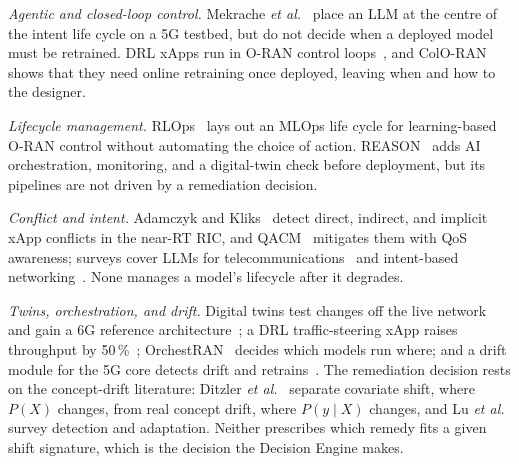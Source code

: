 \documentclass[conference]{IEEEtran}
\begin{document}
\emph{Agentic and closed-loop control.} Mekrache \textit{et al.}~\cite{mekrache2024intent}
place an LLM at the centre of the intent life cycle on a 5G testbed, but do not decide when a
deployed model must be retrained. DRL xApps run in O-RAN control loops~\cite{bonati2021intelligence},
and ColO-RAN~\cite{polese2023coloran} shows that they need online retraining once deployed,
leaving when and how to the designer.

\emph{Lifecycle management.} RLOps~\cite{li2022rlops} lays out an MLOps life cycle for
learning-based O-RAN control without automating the choice of action.
REASON~\cite{parraullauri2025reason} adds AI orchestration, monitoring, and a digital-twin check
before deployment, but its pipelines are not driven by a remediation decision.

\emph{Conflict and intent.} Adamczyk and Kliks~\cite{adamczyk2023conflict} detect direct,
indirect, and implicit xApp conflicts in the near-RT RIC, and QACM~\cite{wadud2024qacm}
mitigates them with QoS awareness; surveys cover LLMs for telecommunications~\cite{zhou2025llm}
and intent-based networking~\cite{leivadeas2023survey}. None manages a model's lifecycle after
it degrades.

\emph{Twins, orchestration, and drift.} Digital twins test changes off the live
network~\cite{masaracchia2023digital} and gain a 6G reference
architecture~\cite{zakihindi2026reference}; a DRL traffic-steering xApp raises throughput by
50\,\%~\cite{lacava2024programmable}; OrchestRAN~\cite{doro2022orchestran} decides which models
run where; and a drift module for the 5G core detects drift and retrains~\cite{manias2022model}.
The remediation decision rests on the concept-drift literature: Ditzler
\textit{et al.}~\cite{ditzler2015learning} separate covariate shift, where $P(X)$ changes, from
real concept drift, where $P(y\mid X)$ changes, and Lu \textit{et al.}~\cite{lu2019learning}
survey detection and adaptation. Neither prescribes which remedy fits a given shift signature,
which is the decision the Decision Engine makes.
\end{document}
